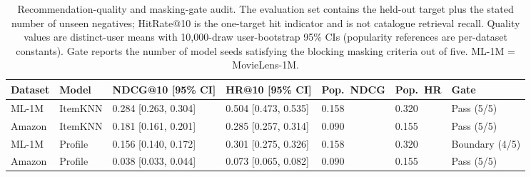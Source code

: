 \begin{table}[!htbp]
\centering\scriptsize
\setlength{\tabcolsep}{2.5pt}
\caption{Recommendation-quality and masking-gate audit. The evaluation set contains the held-out target plus the stated number of unseen negatives; HitRate@10 is the one-target hit indicator and is not catalogue retrieval recall. Quality values are distinct-user means with 10,000-draw user-bootstrap 95\% CIs (popularity references are per-dataset constants). Gate reports the number of model seeds satisfying the blocking masking criteria out of five. ML-1M = MovieLens-1M.}
\label{tab:recommendation-quality}
\begin{tabular}{@{}lllllll@{}}
\toprule
Dataset & Model & NDCG@10 [95\% CI] & HR@10 [95\% CI] & Pop.\ NDCG & Pop.\ HR & Gate \\
\midrule
ML-1M & ItemKNN & 0.284 [0.263, 0.304] & 0.504 [0.473, 0.535] & 0.158 & 0.320 & Pass (5/5) \\
Amazon & ItemKNN & 0.181 [0.161, 0.201] & 0.285 [0.257, 0.314] & 0.090 & 0.155 & Pass (5/5) \\
ML-1M & Profile & 0.156 [0.140, 0.172] & 0.301 [0.275, 0.326] & 0.158 & 0.320 & Boundary (4/5) \\
Amazon & Profile & 0.038 [0.033, 0.044] & 0.073 [0.065, 0.082] & 0.090 & 0.155 & Pass (5/5) \\
\bottomrule
\end{tabular}
\end{table}
